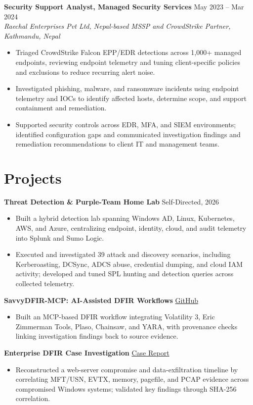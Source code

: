 \documentclass{resume2}
\begin{document}
\textbf{Security Support Analyst, Managed Security Services} \hfill May 2023 -- Mar 2024\\
\textit{Raechal Enterprises Pvt Ltd, Nepal-based MSSP and CrowdStrike Partner, Kathmandu, Nepal}
\begin{itemize}
  \item Triaged CrowdStrike Falcon EPP/EDR detections across 1,000+ managed endpoints, reviewing endpoint telemetry and tuning client-specific policies and exclusions to reduce recurring alert noise.
  \item Investigated phishing, malware, and ransomware incidents using endpoint telemetry and IOCs to identify affected hosts, determine scope, and support containment and remediation.
  \item Supported security controls across EDR, MFA, and SIEM environments; identified configuration gaps and communicated investigation findings and remediation recommendations to client IT and management teams.
\end{itemize}

\section{Projects}
\textbf{Threat Detection \& Purple-Team Home Lab} \hfill Self-Directed, 2026
\begin{itemize}
  \item Built a hybrid detection lab spanning Windows AD, Linux, Kubernetes, AWS, and Azure, centralizing endpoint, identity, cloud, and audit telemetry into Splunk and Sumo Logic.
  \item Executed and investigated 39 attack and discovery scenarios, including Kerberoasting, DCSync, ADCS abuse, credential dumping, and cloud IAM activity; developed and tuned SPL hunting and detection queries across collected telemetry.
\end{itemize}

\textbf{SavvyDFIR-MCP: AI-Assisted DFIR Workflows} \hfill \href{https://github.com/kismatkunwar89/SAVVYDFIR-MCP}{GitHub}
\begin{itemize}
  \item Built an MCP-based DFIR workflow integrating Volatility 3, Eric Zimmerman Tools, Plaso, Chainsaw, and YARA, with provenance checks linking investigation findings back to source evidence.
\end{itemize}

\textbf{Enterprise DFIR Case Investigation} \hfill \href{https://kismatkunwar89.github.io/portfolio/dfir-final.html}{Case Report}
\begin{itemize}
  \item Reconstructed a web-server compromise and data-exfiltration timeline by correlating MFT/USN, EVTX, memory, pagefile, and PCAP evidence across compromised Windows systems; validated key findings through SHA-256 correlation.
\end{itemize}
\end{document}
